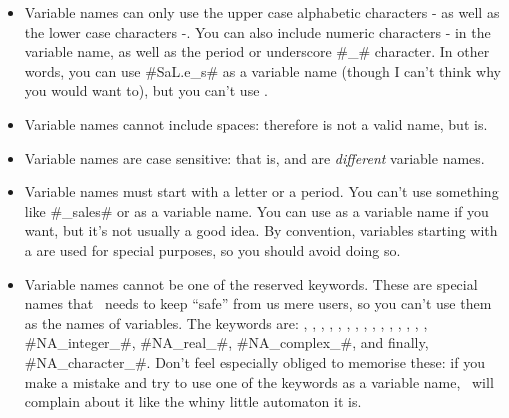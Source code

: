 \begin{itemize}
\item Variable names can only use the upper case alphabetic characters - as well as the lower case characters -{}. You can also include numeric characters - in the variable name, as well as the period  or underscore \rtextverb#_# character. In other words, you can use \rtextverb#SaL.e_s# as a variable name (though I can't think why you would want to), but you can't use . 
\item Variable names cannot include spaces: therefore  is not a valid name, but  is.
\item Variable names are case sensitive: that is,  and  are {\it different} variable names.
\item Variable names must start with a letter or a period. You can't use something like \rtextverb#_sales# or  as a variable name. You can use  as a variable name if you want, but it's not usually a good idea. By convention, variables starting with a  are used for special purposes, so you should avoid doing so. 
\item Variable names cannot be one of the reserved keywords. These are special names that \R\ needs to keep ``safe'' from us mere users, so you can't use them as the names of variables. The keywords are: , , , , , , , , , , , , , , , \rtextverb#NA_integer_#, \rtextverb#NA_real_#, \rtextverb#NA_complex_#, and finally,  \rtextverb#NA_character_#. Don't feel especially obliged to memorise these: if you make a mistake and try to use one of the keywords as a variable name, \R\ will complain about it like the whiny little automaton it is.
\end{itemize}

